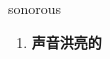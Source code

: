 
\begin{frame}
{\huge sonorous}
\begin{center}
\begin{enumerate}\Large
  \item \textbf{声音洪亮的}
\end{enumerate}
\end{center}
\end{frame}

